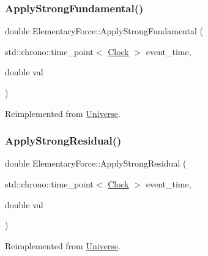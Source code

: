 \subsubsection{\texorpdfstring{Apply\+Strong\+Fundamental()}{ApplyStrongFundamental()}}
{\footnotesize\ttfamily double Elementary\+Force\+::\+Apply\+Strong\+Fundamental (\begin{DoxyParamCaption}\item[{std\+::chrono\+::time\+\_\+point$<$ \mbox{\hyperlink{universe_8h_a0ef8d951d1ca5ab3cfaf7ab4c7a6fd80}{Clock}} $>$}]{event\+\_\+time,  }\item[{double}]{val }\end{DoxyParamCaption})\hspace{0.3cm}{\ttfamily [virtual]}}



Reimplemented from \mbox{\hyperlink{classUniverse_a62789bcff84bd750b0366004381e2fdd}{Universe}}.

\mbox{\label{classElementaryForce_a185dc4e0b840505df27dbbed9fdcdc7b}} 
\subsubsection{\texorpdfstring{Apply\+Strong\+Residual()}{ApplyStrongResidual()}}
{\footnotesize\ttfamily double Elementary\+Force\+::\+Apply\+Strong\+Residual (\begin{DoxyParamCaption}\item[{std\+::chrono\+::time\+\_\+point$<$ \mbox{\hyperlink{universe_8h_a0ef8d951d1ca5ab3cfaf7ab4c7a6fd80}{Clock}} $>$}]{event\+\_\+time,  }\item[{double}]{val }\end{DoxyParamCaption})\hspace{0.3cm}{\ttfamily [virtual]}}



Reimplemented from \mbox{\hyperlink{classUniverse_af7becebb347be9a85541d96a3eca1ca7}{Universe}}.

\mbox{\label{classElementaryForce_aabf66a859e6e808a65c6929cd16f7597}} 
